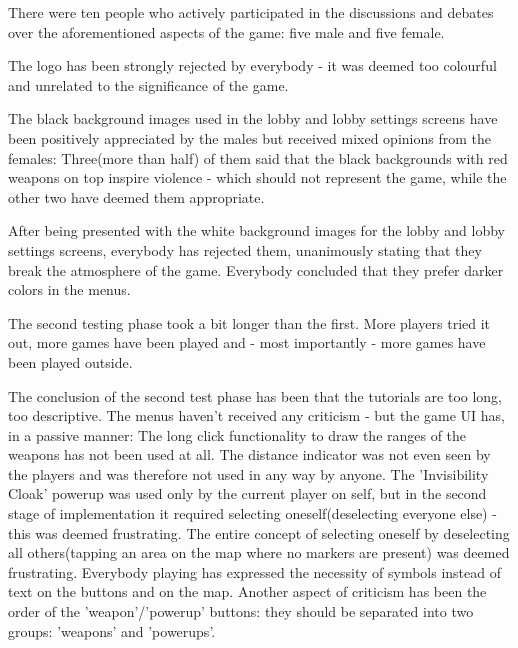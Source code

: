 There were ten people who actively participated in the discussions and debates
over the aforementioned aspects of the game: five male and five female.\newline

The logo has been strongly rejected by everybody - it was deemed too colourful
and unrelated to the significance of the game.\newline

The black background images used in the lobby and lobby settings screens have
been positively appreciated by the males but received mixed opinions from the
females: Three(more than half) of them said that the black backgrounds with
red weapons on top inspire violence - which should not represent the game, while
the other two have deemed them appropriate.\newline

After being presented with the white background images for the lobby and lobby
settings screens, everybody has rejected them, unanimously stating that they
break the atmosphere of the game. Everybody concluded that they prefer darker
colors in the menus.\newline

The second testing phase took a bit longer than the first. More players tried it
out, more games have been played and - most importantly - more games have been
played outside.\newline

The conclusion of the second test phase has been that the tutorials are too
long, too descriptive. The menus haven't received any criticism - but the game
UI has, in a passive manner: The long click functionality to draw the ranges of
the weapons has not been used at all. The distance indicator was not even seen
by the players and was therefore not used in any way by anyone. The
'Invisibility Cloak' powerup was used only by the current player on self, but in
the second stage of implementation it required selecting oneself(deselecting
everyone else) - this was deemed frustrating. The entire concept of selecting
oneself by deselecting all others(tapping an area on the map where no markers
are present) was deemed frustrating. Everybody playing has expressed the
necessity of symbols instead of text on the buttons and on the map. Another
aspect of criticism has been the order of the 'weapon'/'powerup' buttons: they
should be separated into two groups: 'weapons' and 'powerups'.\newline
